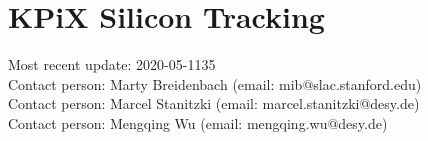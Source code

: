 \newcommand{\LYCORIS}{{\textsc{Lycoris}}\xspace}
\newcommand{\DESYII}{{\mbox{DESY II}}\xspace}
\newcommand{\DIITBF}{{\DESYII Test Beam Facility}\xspace}
\newcommand{\SID}{{SiD}\xspace}
\newcommand{\KPIX}{{KPiX}\xspace}


\section{\KPIX Silicon Tracking}
Most recent update: 2020-05-1135 \\
Contact person: Marty Breidenbach (email: mib@slac.stanford.edu)\\
Contact person: Marcel Stanitzki (email: marcel.stanitzki@desy.de)\\
Contact person: Mengqing Wu (email: mengqing.wu@desy.de)\\




